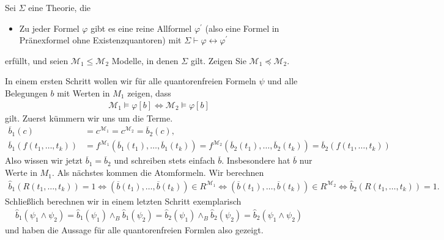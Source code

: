 
\begin{exercise}[146]
Sei $\Sigma$ eine Theorie, die
\begin{itemize}
  \item Zu jeder Formel $\varphi$ gibt es eine reine Allformel $\varphi^{\prime}$
  (also eine Formel in Pränexformel ohne Existenzquantoren) mit
  $\Sigma \vdash \varphi \leftrightarrow \varphi^{\prime}$
\end{itemize}
erfüllt, und seien $\mathscr{M}_1 \leq \mathscr{M}_2$ Modelle, in denen $\Sigma$ gilt.
Zeigen Sie $\mathscr{M}_1 \preccurlyeq \mathscr{M}_2$.
\end{exercise}


\begin{solution}
	In einem ersten Schritt wollen wir für alle quantorenfreien Formeln $\psi$ und alle Belegungen $b$ mit Werten in $M_1$ zeigen, dass 
	\begin{align*}
	\mathscr{M}_1 \vDash \varphi[b] \iff \mathscr{M}_2 \vDash \varphi[b]
	\end{align*}
	gilt. Zuerst kümmern wir uns um die Terme.
	\begin{align*}
	\overline{b}_1(c) &= c^{\mathscr{M}_1} = c^{\mathscr{M}_2} = \overline{b}_2(c), \\
	\overline{b}_1(f(t_1, \dots, t_k)) &= f^{\mathscr{M}_1}(\overline{b}_1(t_1), \dots, \overline{b}_1(t_k)) = f^{\mathscr{M}_2}(\overline{b}_2(t_1), \dots, \overline{b}_2(t_k)) = \overline{b}_2(f(t_1, \dots, t_k))
	\end{align*}
	Also wissen wir jetzt $\overline{b}_1 = \overline{b}_2$ und schreiben stets einfach $\overline{b}$. Insbesondere hat $\overline{b}$ nur Werte in $M_1$. Als nächstes kommen die Atomformeln. Wir berechnen
	\begin{align*}
	\widehat{b}_1(R(t_1, \dots, t_k)) = 1 \Leftrightarrow (\overline{b}(t_1), \dots, \overline{b}(t_k)) \in R^{\mathscr{M}_1} \Leftrightarrow  (\overline{b}(t_1), \dots, \overline{b}(t_k)) \in R^{\mathscr{M}_2} \Leftrightarrow \widehat{b}_2(R(t_1, \dots, t_k)) = 1.
	\end{align*}
	Schließlich berechnen wir in einem letzten Schritt exemplarisch 
	\begin{align*}
	\widehat{b}_1(\psi_1 \land \psi_2) = \widehat{b}_1(\psi_1) \land_B \widehat{b}_1 (\psi_2) = \widehat{b}_2(\psi_1) \land_B \widehat{b}_2(\psi_2) = \widehat{b}_2(\psi_1 \land \psi_2)
	\end{align*}
	und haben die Aussage für alle quantorenfreien Formlen also gezeigt.
\end{solution}

